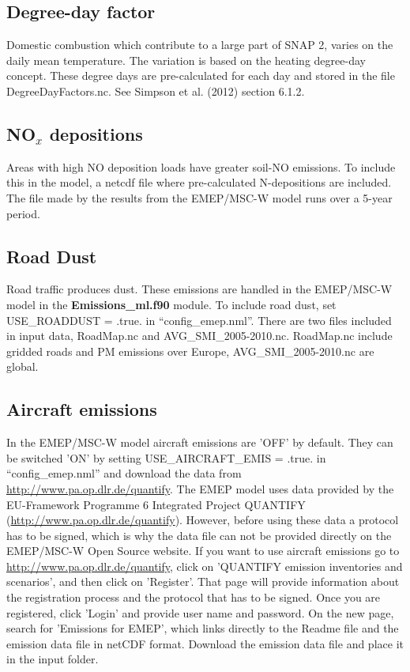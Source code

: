 \subsection{Degree-day factor}
Domestic combustion which contribute to a large part of SNAP 2, varies on the daily 
mean temperature. The variation is based on the heating degree-day concept. These 
degree days are pre-calculated for each day and stored in the file DegreeDayFactors.nc. 
See Simpson et al. (2012) section 6.1.2. 


\subsection{NO$_x$ depositions}
Areas with high NO deposition loads have greater soil-NO emissions. To include this in 
the model, a netcdf file where pre-calculated N-depositions are included. The file made by 
the results from the EMEP/MSC-W model runs over a 5-year period. 


\subsection{Road Dust}
Road traffic produces dust. These emissions are handled in the EMEP/MSC-W model in the 
{\bf Emissions\_ml.f90} module. To include road dust, set USE\_ROADDUST = .true. in ``config\_emep.nml''. There are two files included in input data, RoadMap.nc and 
AVG\_SMI\_2005-2010.nc. RoadMap.nc include gridded roads and PM emissions over Europe, 
AVG\_SMI\_2005-2010.nc are global. 

\subsection{Aircraft emissions}
\label{emisair}

In the EMEP/MSC-W model aircraft emissions are 'OFF' by default. 
They can be switched 'ON' by setting USE\_AIRCRAFT\_EMIS = .true. in ``config\_emep.nml'' and download the data from \url{http://www.pa.op.dlr.de/quantify}.  
The EMEP model uses data provided by the EU-Framework Programme 6 Integrated 
Project QUANTIFY (\url{http://www.pa.op.dlr.de/quantify}). However, before using 
these data a protocol has to be signed, which is why the data file can not be provided 
directly on the EMEP/MSC-W Open Source website. If you want to use aircraft emissions go to 
\url{http://www.pa.op.dlr.de/quantify}, click on 'QUANTIFY emission inventories and scenarios', 
and then click on 'Register'. That page will provide information about the registration 
process and the protocol that has to be signed. Once you are registered, click 'Login' and 
provide user name and password. On the new page, search for 'Emissions for EMEP', which 
links directly to the Readme file and the emission data file in netCDF format. Download the 
emission data file and place it in the input folder.

